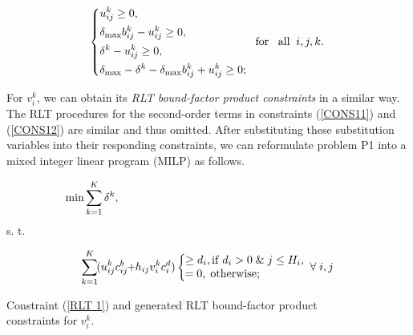 \documentclass[journal]{IEEEtran}
\begin{document}
\begin{equation}
\left\{ {\begin{aligned}&{
{u_{ij}^k \ge 0}},\\
&{{\delta _{\max }}   b_{ij}^k - u_{ij}^k \ge 0},\\
&{{\delta ^k} - u_{ij}^k \ge 0},\\
&{ {\delta _{\max }} - {\delta ^k} - {\delta _{\max }}  b_{ij}^k + u_{ij}^k \ge 0 };
\end{aligned}\;\;\;{\rm{for}}\;\;\;{\rm{all}}\;\;i,j,k}. \right.\\
\label{RLT 1}
\end{equation}

For $v_i^k$, we can obtain its \emph{RLT bound-factor product constraints} in a similar way. The
RLT procedures for the second-order terms in constraints (\ref{CONS11}) and (\ref{CONS12}) are
similar and thus omitted. After substituting these substitution variables into their responding
constraints, we can reformulate problem P1 into a mixed integer linear program (MILP) as
follows.

\begin{equation}
 \min \sum\limits_{k = 1}^K
{{\delta ^k}} ,\label{OBJ2} \hspace{7.3cm}
\end{equation}
\hspace{0cm}s. t.


\begin{equation}\hspace{0.0cm}
\sum\limits_{k = 1}^K \hspace{-0.1cm}{(u_{ij}^k  {c_{ij}^b}\hspace{-0.1cm} +
\hspace{-0.1cm}{h_{ij}}v_i^k c_i^d)} \left\{ {\begin{array}{*{20}{c}}
{\hspace{-0.2cm} \ge {d_i},{\rm{if}}\;{d_i} > 0\;\&\;j \le {H_i}},\\
{\hspace{-0.2cm}=0,\;{\rm{otherwise}};\hspace{1.4cm}}
\end{array}\forall \;i,j} \right.\label{CONS5_RLT}
\end{equation}

\hspace{0.15cm}Constraint (\ref{RLT 1}) and generated RLT bound-factor product \\

\hspace{0.15cm}constraints for $v_i^k$.\\
\end{document}

